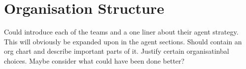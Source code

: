 \chapter{Organisation Structure}\label{organisation_structure}

Could introduce each of the teams and a one liner about their agent strategy. This will obviously be expanded upon in the agent sections.
Should contain an org chart and describe important parts of it.
Justify certain organisatinbal choices.
Maybe consider what could have been done better?

